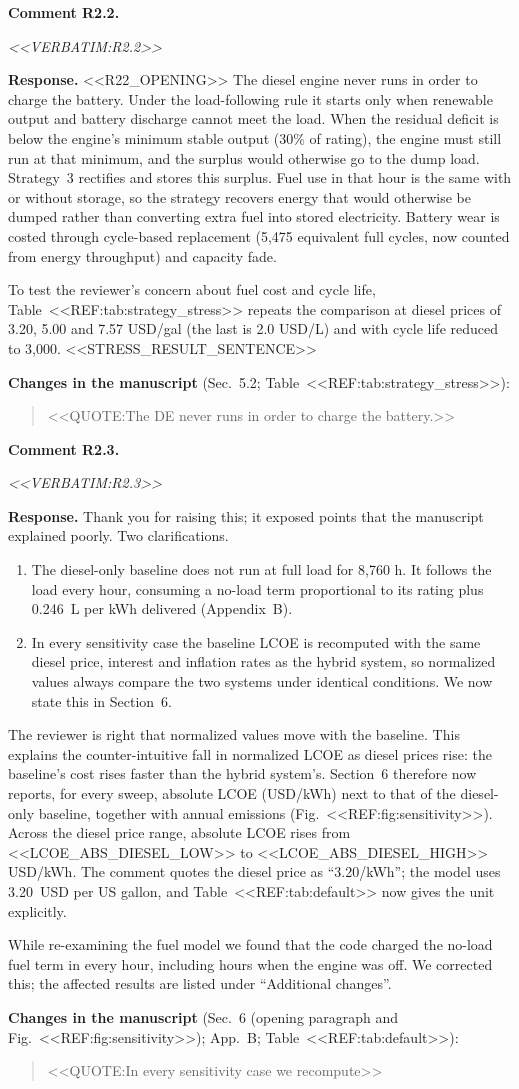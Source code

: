 \documentclass[11pt]{article}
\newcounter{rc}
\newcommand{\rcomment}[2]{\stepcounter{rc}\par\medskip
  \noindent\textbf{Comment #1.}\par
  {\color{commentgrey}\itshape #2\par}}
\newcommand{\response}[1]{\par\noindent\textbf{Response.} #1\par}
\newcommand{\change}[2]{\par\noindent\textbf{Changes in the manuscript} (#1):\par
  \begin{quote}\color{revblue}#2\end{quote}}
\begin{document}
\rcomment{R2.2}{<<VERBATIM:R2.2>>}
\response{<<R22_OPENING>> The diesel engine never runs in order to charge the battery. Under the load-following rule it starts only when renewable output and battery discharge cannot meet the load. When the residual deficit is below the engine's minimum stable output (30\% of rating), the engine must still run at that minimum, and the surplus would otherwise go to the dump load. Strategy~3 rectifies and stores this surplus. Fuel use in that hour is the same with or without storage, so the strategy recovers energy that would otherwise be dumped rather than converting extra fuel into stored electricity. Battery wear is costed through cycle-based replacement (5,475 equivalent full cycles, now counted from energy throughput) and capacity fade.

To test the reviewer's concern about fuel cost and cycle life, Table~<<REF:tab:strategy_stress>> repeats the comparison at diesel prices of 3.20, 5.00 and 7.57 USD/gal (the last is 2.0 USD/L) and with cycle life reduced to 3,000. <<STRESS_RESULT_SENTENCE>>}
\change{Sec.~5.2; Table~<<REF:tab:strategy_stress>>}{<<QUOTE:The DE never runs in order to charge the battery.>>}

\rcomment{R2.3}{<<VERBATIM:R2.3>>}
\response{Thank you for raising this; it exposed points that the manuscript explained poorly. Two clarifications.
\begin{enumerate}[leftmargin=*,itemsep=1pt]
\item The diesel-only baseline does not run at full load for 8,760 h. It follows the load every hour, consuming a no-load term proportional to its rating plus 0.246~L per kWh delivered (Appendix~B).
\item In every sensitivity case the baseline LCOE is recomputed with the same diesel price, interest and inflation rates as the hybrid system, so normalized values always compare the two systems under identical conditions. We now state this in Section~6.
\end{enumerate}
The reviewer is right that normalized values move with the baseline. This explains the counter-intuitive fall in normalized LCOE as diesel prices rise: the baseline's cost rises faster than the hybrid system's. Section~6 therefore now reports, for every sweep, absolute LCOE (USD/kWh) next to that of the diesel-only baseline, together with annual emissions (Fig.~<<REF:fig:sensitivity>>). Across the diesel price range, absolute LCOE rises from <<LCOE_ABS_DIESEL_LOW>> to <<LCOE_ABS_DIESEL_HIGH>> USD/kWh. The comment quotes the diesel price as ``3.20/kWh''; the model uses 3.20~USD per US gallon, and Table~<<REF:tab:default>> now gives the unit explicitly.

While re-examining the fuel model we found that the code charged the no-load fuel term in every hour, including hours when the engine was off. We corrected this; the affected results are listed under ``Additional changes''.}
\change{Sec.~6 (opening paragraph and Fig.~<<REF:fig:sensitivity>>); App.~B; Table~<<REF:tab:default>>}{<<QUOTE:In every sensitivity case we recompute>>}
\end{document}
